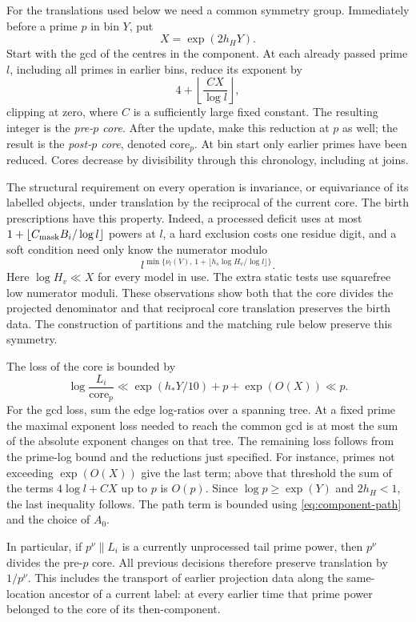 For the translations used below we need a common symmetry group.
Immediately before a prime $p$ in bin $Y$, put
\[
 X=\exp(2h_HY).
\]
Start with the gcd of the centres in the component.  At each already
passed prime $l$, including all primes in earlier bins, reduce its
exponent by
\[
 4+\left\lfloor\frac{CX}{\log l}\right\rfloor,
\]
clipping at zero, where $C$ is a sufficiently large fixed constant.
The resulting integer is the \emph{pre-$p$ core}.  After the update,
make this reduction at $p$ as well; the result is the
\emph{post-$p$ core}, denoted $\mathrm{core}_p$.  At bin start only
earlier primes have been reduced.  Cores decrease by divisibility
through this chronology, including at joins.

The structural requirement on every operation is invariance, or
equivariance of its labelled objects, under translation by the
reciprocal of the current core.  The birth prescriptions have this
property.  Indeed, a processed deficit uses at most
$1+\lfloor C_{\rm mask}B_i/\log l\rfloor$ powers at $l$, a hard
exclusion costs one residue digit, and a soft condition need only know
the numerator modulo
\[
 l^{\min\{\nu_l(V),\,1+\lfloor h_s\log H_v/\log l\rfloor\}}.
\]
Here $\log H_v\ll X$ for every model in use.  The extra static tests
use squarefree low numerator moduli.  These observations show both
that the core divides the projected denominator and that reciprocal
core translation preserves the birth data.  The construction of
partitions and the matching rule below preserve this symmetry.

The loss of the core is bounded by
\begin{equation}
 \log\frac{L_i}{\mathrm{core}_p}
 \ll \exp(h_*Y/10)+p+\exp(O(X))\ll p.
 \label{eq:core-loss}
\end{equation}
For the gcd loss, sum the edge log-ratios over a spanning tree.  At a
fixed prime the maximal exponent loss needed to reach the common gcd
is at most the sum of the absolute exponent changes on that tree.
The remaining loss follows from the prime-log bound and the reductions
just specified.  For instance, primes not exceeding $\exp(O(X))$
give the last term; above that threshold the sum of the terms
$4\log l+CX$ up to $p$ is $O(p)$.  Since $\log p\ge\exp(Y)$ and
$2h_H<1$, the last inequality follows.  The path term is bounded using
\eqref{eq:component-path} and the choice of $A_0$.

In particular, if $p^\nu\parallel L_i$ is a currently unprocessed
tail prime power, then $p^\nu$ divides the pre-$p$ core.  All previous
decisions therefore preserve translation by $1/p^\nu$.  This includes
the transport of earlier projection data along the same-location
ancestor of a current label: at every earlier time that prime power
belonged to the core of its then-component.

